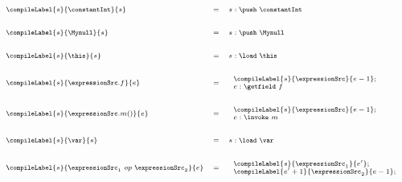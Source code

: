 \begin{figure}[ht!]
\begin{frameit}
$${\scriptsize 
        \begin{array}{lll} 
	\compileLabel{s}{\constantInt}{s} &  =  & s : \push \  \constantInt \\
	& & \\ & & \\
	\compileLabel{s}{\Mynull }{s } & = &  s: \push \ \Mynull\\
	& & \\ & & \\
	\compileLabel{s}{\this}{s } & = &  s:  \load \ \this \\
	& & \\ & & \\ 
	\compileLabel{s}{ \expressionSrc.f}{e} & = &    
         \begin{array}{l}
              \compileLabel{s}{\expressionSrc}{e - 1}; \\ 
              e : \getfield  \ f
           \end{array} \\
	& & \\ & & \\ 
	\compileLabel{s}{\expressionSrc.m( )}{e} & = &  
	   \begin{array}{l}  
                 \compileLabel{s}{\expressionSrc}{e - 1};\\
		  e  :\invoke \ m
            \end{array}  \\
	& & \\ & & \\
	\compileLabel{s}{ \var }{s} & = &   s: \load \ \var \\
	& & \\ & & \\
	\compileLabel{s}{ \expressionSrc_1 \ op \ \expressionSrc_2 }{e} & = &  
                 \begin{array}{l}
                       \compileLabel{s}{ \expressionSrc_1}{  e'  } ; \\
                       \compileLabel{e' + 1}{ \expressionSrc_2}{ e - 1  }; \\

\end{array}
\end{array}}$$
\end{frameit}
\end{figure}
